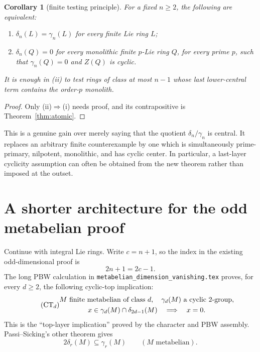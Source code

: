 \documentclass[a4paper,11pt,reqno]{amsart}
\newtheorem{corollary}[theorem]{Corollary}
\theoremstyle{definition}
\theoremstyle{remark}
\newcommand{\dlt}{\delta}
\newcommand{\gm}{\gamma}
\begin{document}
\begin{corollary}[finite testing principle]\label{cor:testing}
For a fixed $n\geq2$, the following are equivalent:
\begin{enumerate}[label=\textup{(\roman*)}]
\item $\dlt_n(L)=\gm_n(L)$ for every finite Lie ring $L$;
\item $\dlt_n(Q)=0$ for every monolithic finite $p$-Lie ring $Q$, for every
prime $p$, such that $\gm_n(Q)=0$ and $Z(Q)$ is cyclic.
\end{enumerate}
It is enough in (ii) to test rings of class at most $n-1$ whose last
lower-central term contains the order-$p$ monolith.
\end{corollary}

\begin{proof}
Only (ii)$\Rightarrow$(i) needs proof, and its contrapositive is
Theorem~\ref{thm:atomic}.
\end{proof}

This is a genuine gain over merely saying that the quotient
$\dlt_n/\gm_n$ is central.  It replaces an arbitrary finite counterexample by
one which is simultaneously prime-primary, nilpotent, monolithic, and has
cyclic center.  In particular, a last-layer cyclicity assumption can often be
obtained from the new theorem rather than imposed at the outset.

\section{A shorter architecture for the odd metabelian proof}

Continue with integral Lie rings.  Write $c=n+1$, so the index in the existing
odd-dimensional proof is
\[
                         2n+1=2c-1.
\]
The long PBW calculation in
\texttt{metabelian\_dimension\_vanishing.tex} proves, for every $d\geq2$,
the following cyclic-top implication:
\begin{equation*}\tag{$\mathrm{CT}_d$}
\begin{gathered}
 M\text{ finite metabelian of class }d,\quad
 \gm_d(M)\text{ a cyclic }2\text{-group},\\
 x\in\gm_d(M)\cap\dlt_{2d-1}(M)
 \quad\Longrightarrow\quad x=0.
\end{gathered}
\end{equation*}
This is the ``top-layer implication'' proved by the character and PBW assembly.
Passi--Sicking's
other theorem \cite{PS} gives
\begin{equation}\label{eq:PS}
                  2\dlt_r(M)\subseteq\gm_r(M)
                  \qquad(M\text{ metabelian}).
\end{equation}
\end{document}
